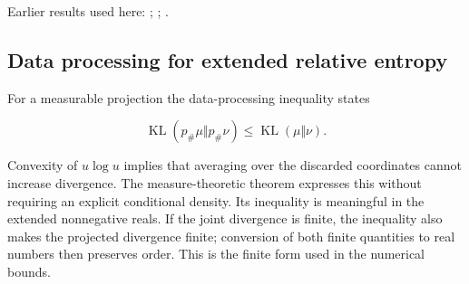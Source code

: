 \documentclass[11pt,a4paper]{report}
\begin{document}
Earlier results used here: \cite[Section~3.1.1]{LangevinLean2026IPLA}; \cite[Section~3.1.6]{LangevinLean2026IPLA}; \cite[Section~3.3.2]{LangevinLean2026IPLA}.
\subsection{\texorpdfstring{Data processing for extended relative entropy}{Data processing for extended relative entropy}}
\label{report-step-IPLA-LSI-Marginal-lean-2}


For a measurable projection the data-processing inequality states

\[\operatorname{KL}(p_\#\mu\Vert p_\#\nu)\le\operatorname{KL}(\mu\Vert\nu).\]

Convexity of \(u\log u\) implies that averaging over the discarded coordinates cannot increase divergence. The measure-theoretic theorem expresses this without requiring an explicit conditional density. Its inequality is meaningful in the extended nonnegative reals. If the joint divergence is finite, the inequality also makes the projected divergence finite; conversion of both finite quantities to real numbers then preserves order. This is the finite form used in the numerical bounds.
\end{document}
